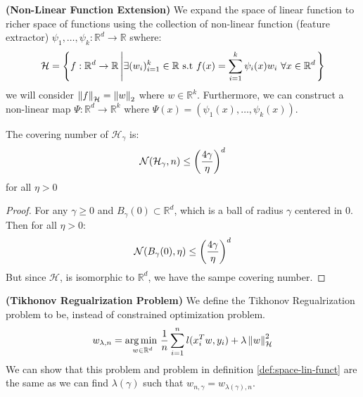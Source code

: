 \begin{definition}{\textbf{(Non-Linear Function Extension)}}
    We expand the space of linear function to richer space of functions using the collection of non-linear function (feature extractor) $\psi_1,\dots,\psi_k : \mathbb{R}^d\rightarrow \mathbb{R}$ swhere:
    \begin{equation*}
        \mathcal{H} = \left\{  f : \mathbb{R}^d\rightarrow \mathbb{R} \left| \exists (w_i)^k_{i=1} \in \mathbb{R} \text{ s.t } f(x) = \sum^k_{i=1} \psi_i(x)w_i \ \forall x \in \mathbb{R}^d \right. \right\}
    \end{equation*} 
    we will consider $\left\lVert f\right\rVert_\mathcal{H} = \left\lVert w\right\rVert_2$ where $w\in \mathbb{R}^k$. Furthermore, we can construct a non-linear map $\Psi:\mathbb{R}^d\rightarrow \mathbb{R}^k$ where $\Psi(x) = (\psi_1(x),\dots,\psi_k(x))$.
\end{definition}

\begin{theorem}
    The covering number of $\mathcal{H}_\gamma$ is: 
    \begin{equation*}
        \mathcal{N}(\mathcal{H}_\gamma, n)\le\left( \frac{4\gamma}{\eta} \right)^d
    \end{equation*}
    for all $\eta>0$
\end{theorem}
\begin{proof}
    For any $\gamma\ge0$ and $B_\gamma(0)\subset \mathbb{R}^d$, which is a ball of radius $\gamma$ centered in $0$. Then for all $\eta>0$:
    \begin{equation*}
        \mathcal{N}(B_\gamma(0), \eta) \le \left( \frac{4\gamma}{\eta} \right)^d
    \end{equation*}
    But since $ \mathcal{H} $, is isomorphic to $\mathbb{R}^d$, we have the sampe covering number.
\end{proof}

\begin{definition}{\textbf{(Tikhonov Regualrization Problem)}}
    We define the Tikhonov Regualrization problem to be, instead of constrained optimization problem.
    \begin{equation*}
        w_{\lambda, n} = \underset{w\in \mathbb{R}^d}{\arg\min \ } \frac{1}{n}\sum^n_{i=1} l(x_i^Tw, y_i) + \lambda\left\lVert w\right\rVert^2_\mathcal{H}
    \end{equation*}
    We can show that this problem and problem in definition \ref{def:space-lin-funct} are the same as we can find $\lambda(\gamma)$ such that $w_{n, \gamma} = w_{\lambda(\gamma), n}$. 
\end{definition}

